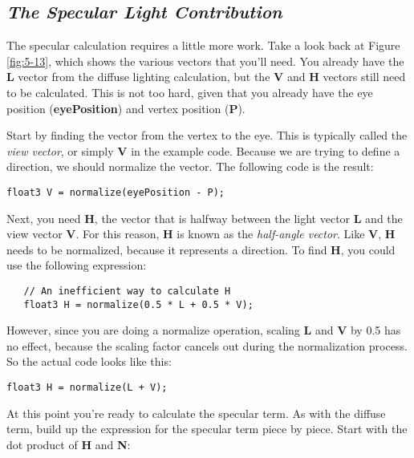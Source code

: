 \documentclass[../main.tex]{subfiles}
\begin{document}
\subsection*{\textit{The Specular Light Contribution}}

The specular calculation requires a little more work. Take a look back at Figure \ref{fig:5-13}, which shows the various vectors that you'll need. You already have the \textbf{L} vector from the diffuse lighting calculation, but the \textbf{V} and \textbf{H} vectors still need to be calculated. This is not too hard, given that you already have the eye position (\textbf{eyePosition}) and vertex position (\textbf{P}).

Start by finding the vector from the vertex to the eye. This is typically called the \textit{view vector}, or simply \textbf{V} in the example code. Because we are trying to define a direction, we should normalize the vector. The following code is the result:

\FloatBarrier
\begin{lstlisting}
float3 V = normalize(eyePosition - P);
\end{lstlisting}
\FloatBarrier

Next, you need \textbf{H}, the vector that is halfway between the light vector \textbf{L} and the view vector \textbf{V}. For this reason, \textbf{H} is known as the \textit{half-angle vector}. Like \textbf{V}, \textbf{H} needs to be normalized, because it represents a direction. To find \textbf{H}, you could use the following expression:

\FloatBarrier
\begin{lstlisting}
   // An inefficient way to calculate H
   float3 H = normalize(0.5 * L + 0.5 * V);
\end{lstlisting}
\FloatBarrier

However, since you are doing a normalize operation, scaling \textbf{L} and \textbf{V} by 0.5 has no effect, because the scaling factor cancels out during the normalization process. So the actual code looks like this:

\FloatBarrier
\begin{lstlisting}
float3 H = normalize(L + V);
\end{lstlisting}
\FloatBarrier

At this point you're ready to calculate the specular term. As with the diffuse term, build up the expression for the specular term piece by piece. Start with the dot product of \textbf{H} and \textbf{N}:
\end{document}

